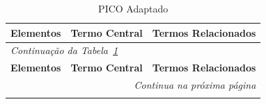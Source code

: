 \begin{longtable}{|p{2.5cm}|p{3.5cm}|p{8.6cm}|}
    \caption{PICO Adaptado}
    \label{tab-PICO} \\
    \hline
    \textbf{Elementos} & \textbf{Termo Central} & \textbf{Termos Relacionados} \\
    \hline
    \endfirsthead

    \multicolumn{3}{l}{\small\textit{Continuação da Tabela~\ref{tab-PICO}}} \\
    \hline
    \textbf{Elementos} & \textbf{Termo Central} & \textbf{Termos Relacionados} \\
    \hline
    \endhead

    \hline
    \multicolumn{3}{r}{\small\textit{Continua na próxima página}} \\
    \endfoot

    \hline
    \endlastfoot


\end{longtable}
